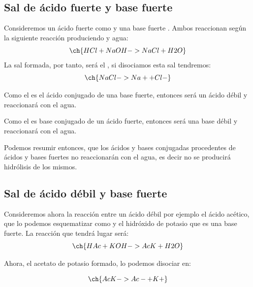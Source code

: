     \subsection{Sal de ácido fuerte y base fuerte}\label{subsec:sal-de-acido-fuerte-y-base-fuerte}

    Consideremos un ácido fuerte como  y una base fuerte .
    Ambos reaccionan según la siguiente reacción produciendo  y agua:
    \begin{equation*}
        \ch{HCl + NaOH -> NaCl + H2O}
    \end{equation*}
    La sal formada, por tanto, será el , si disociamos esta sal tendremos:
    \begin{equation*}
        \ch{NaCl -> Na+ + Cl-}
    \end{equation*}

    Como el  es el ácido conjugado de una base fuerte, entonces será un ácido débil y  reaccionará con el agua.

    Como el  es base conjugado de un ácido fuerte, entonces será una base débil y  reaccionará con el agua.

    Podemos resumir entonces, que los ácidos y bases conjugadas procedentes de ácidos y bases fuertes no reaccionarán con el agua, es decir no se producirá hidrólisis de los mismos.


    \subsection{Sal de ácido débil y base fuerte}\label{subsec:sal-de-acido-debil-y-base-fuerte}

    Consideremos ahora la reacción entre un ácido débil por ejemplo el ácido acético, que lo podemos esquematizar como  y el hidróxido de potasio  que es una base fuerte.
    La reacción que tendrá lugar será:
    \begin{equation*}
        \ch{HAc + KOH -> AcK + H2O}
    \end{equation*}

    Ahora, el acetato de potasio formado, lo podemos disociar en:

    \begin{equation*}
        \ch{AcK -> Ac- + K+}
    \end{equation*}

